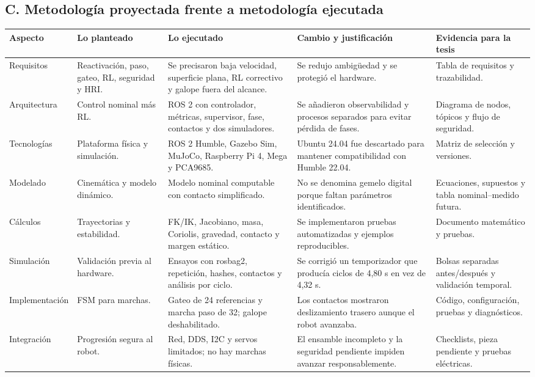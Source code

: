 \documentclass[11pt,letterpaper]{article}
\begin{document}
\begin{landscape}
\section{C. Metodología proyectada frente a metodología ejecutada}
\small
\begin{longtable}{p{2.4cm}p{4.2cm}p{5cm}p{5cm}p{4cm}}
\toprule
\textbf{Aspecto} & \textbf{Lo planteado} & \textbf{Lo ejecutado} & \textbf{Cambio y justificación} & \textbf{Evidencia para la tesis}\\
\midrule
Requisitos & Reactivación, paso, gateo, RL, seguridad y HRI. & Se precisaron baja velocidad, superficie plana, RL correctivo y galope fuera del alcance. & Se redujo ambigüedad y se protegió el hardware. & Tabla de requisitos y trazabilidad.\\
Arquitectura & Control nominal más RL. & ROS 2 con controlador, métricas, supervisor, fase, contactos y dos simuladores. & Se añadieron observabilidad y procesos separados para evitar pérdida de fases. & Diagrama de nodos, tópicos y flujo de seguridad.\\
Tecnologías & Plataforma física y simulación. & ROS 2 Humble, Gazebo Sim, MuJoCo, Raspberry Pi 4, Mega y PCA9685. & Ubuntu 24.04 fue descartado para mantener compatibilidad con Humble 22.04. & Matriz de selección y versiones.\\
Modelado & Cinemática y modelo dinámico. & Modelo nominal computable con contacto simplificado. & No se denomina gemelo digital porque faltan parámetros identificados. & Ecuaciones, supuestos y tabla nominal--medido futura.\\
Cálculos & Trayectorias y estabilidad. & FK/IK, Jacobiano, masa, Coriolis, gravedad, contacto y margen estático. & Se implementaron pruebas automatizadas y ejemplos reproducibles. & Documento matemático y pruebas.\\
Simulación & Validación previa al hardware. & Ensayos con rosbag2, repetición, hashes, contactos y análisis por ciclo. & Se corrigió un temporizador que producía ciclos de 4,80 s en vez de 4,32 s. & Bolsas separadas antes/después y validación temporal.\\
Implementación & FSM para marchas. & Gateo de 24 referencias y marcha paso de 32; galope deshabilitado. & Los contactos mostraron deslizamiento trasero aunque el robot avanzaba. & Código, configuración, pruebas y diagnósticos.\\
Integración & Progresión segura al robot. & Red, DDS, I2C y servos limitados; no hay marchas físicas. & El ensamble incompleto y la seguridad pendiente impiden avanzar responsablemente. & Checklists, pieza pendiente y pruebas eléctricas.\\

\end{longtable}
\end{landscape}
\end{document}
